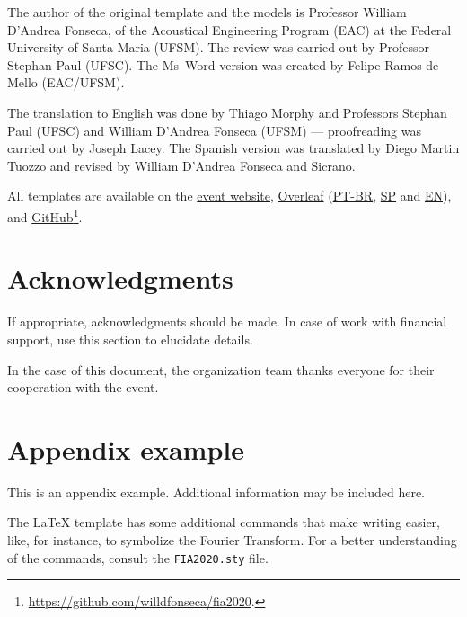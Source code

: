 \documentclass[12pt, a4paper, twoside, twocolumn]{article}
\begin{document}
The author of the original template and the models is Professor William D'Andrea Fonseca, of the Acoustical Engineering Program (EAC) at the Federal University of Santa Maria (UFSM). 
%
The review was carried out by Professor Stephan Paul (UFSC).
%
The Ms~Word version was created by Felipe Ramos de Mello (EAC/UFSM).

The translation to English was done by Thiago Morphy and Professors Stephan Paul (UFSC) and William D'Andrea Fonseca (UFSM) --- proofreading was carried out by Joseph Lacey.
%
The Spanish version was translated by Diego Martin Tuozzo and revised by William D'Andrea Fonseca and Sicrano.


All templates are available on the \href{http://www.fia2022.com.br}{event website}, \href{https://www.overleaf.com/read/hgryywpgmxdx}{Overleaf} (\href{https://www.overleaf.com/read/rnfjxkknksnd}{PT-BR}, \href{https://www.overleaf.com/read/rszcxtwshzfr}{SP} and \href{https://www.overleaf.com/read/hgryywpgmxdx}{EN}),  and \href{https://github.com/willdfonseca/fia2020}{GitHub}\footnote{\url{https://github.com/willdfonseca/fia2020}.}.

\section{Acknowledgments}

If appropriate, acknowledgments should be made. In case of work with financial support, use this section to elucidate details.

In the case of this document, the organization team thanks everyone for their cooperation with the event.

\renewcommand{\refname}{References} 
 
{\fontrefs }
\appendix
\section{Appendix example}

This is an appendix example. Additional information may be included here.

The \LaTeX\xspace template has some additional commands that make writing easier, like, for instance, \F\xspace to symbolize the Fourier Transform. For a better understanding of the commands, consult the \texttt{FIA2020.sty} file.
\end{document}

